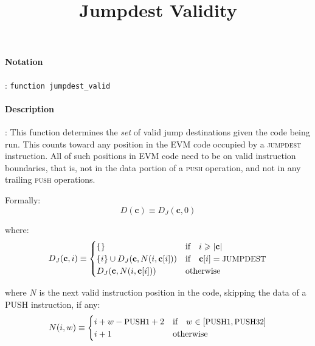 \documentclass[9pt,a4paper,oneside]{scrartcl}
\author{}
\title{Jumpdest Validity}
\date{}
\begin{document}
\maketitle
\paragraph{Notation}: \texttt{function jumpdest\_valid}
\paragraph{Description}: This function determines the \textit{set} of valid jump destinations given the code being run. This counts toward any position in the EVM code occupied by a \textsc{jumpdest} instruction. All of such positions in EVM code need to be on valid instruction boundaries, that is, not in the data portion of a \textsc{push} operation, and not in any trailing \textsc{push} operations. 

Formally:
\begin{equation}
	D(\mathbf{c}) \equiv D_J(\mathbf{c}, 0)
\end{equation}

where:
\begin{equation}
	D_J(\mathbf{c}, i) \equiv \begin{cases}
		\{\} & \text{if} \quad i \geqslant |\mathbf{c}|  \\
		\{ i \} \cup D_J(\mathbf{c}, N(i, \mathbf{c}[i])) & \text{if} \quad \mathbf{c}[i] = \text{\small JUMPDEST} \\
		D_J(\mathbf{c}, N(i, \mathbf{c}[i])) & \text{otherwise} \\
	\end{cases}
\end{equation}

where $N$ is the next valid instruction position in the code, skipping the data of a {\small PUSH} instruction, if any:
\begin{equation}
	N(i, w) \equiv \begin{cases}
		i + w - \text{\small PUSH1} + 2 & \text{if} \quad w \in [\text{\small PUSH1}, \text{\small PUSH32}] \\
	i + 1 & \text{otherwise} \end{cases}
\end{equation}




\printbibliography
\end{document}
